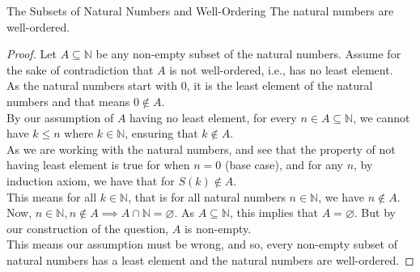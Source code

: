 \begin{Theorem}{The Subsets of Natural Numbers and Well-Ordering}\label{well-ordering_of_subsets_of_natural_numbers}
	The natural numbers are well-ordered.
\end{Theorem}
\begin{proof}
	Let $A\subseteq\mathbb{N}$ be any non-empty subset of the natural numbers. Assume for the sake of contradiction that $A$ is not well-ordered, i.e., has no least element.\\
	As the natural numbers start with $0$, it is the least element of the natural numbers and that means $0\notin A$.\\
	By our assumption of $A$ having no least element, for every $n\in A\subseteq\mathbb{N}$, we cannot have $k\leq n$ where $k\in\mathbb{N}$, ensuring that $k\notin A$.\\
	As we are working with the natural numbers, and see that the property of not having least element is true for when $n=0$ (base case), and for any $n$, by induction axiom, we have that for $S(k)\notin A$.\\
	This means for all $k\in\mathbb{N}$, that is for all natural numbers $n\in\mathbb{N}$, we have $n\notin A$.\\
	Now, $n\in\mathbb{N}, n\notin A\implies A\cap \mathbb{N}=\varnothing$. As $A\subseteq\mathbb{N}$, this implies that $A=\varnothing$. But by our construction of the question, $A$ is non-empty.\\
	This means our assumption must be wrong, and so, every non-empty subset of natural numbers has a least element and the natural numbers are well-ordered.
\end{proof}
\exercise

